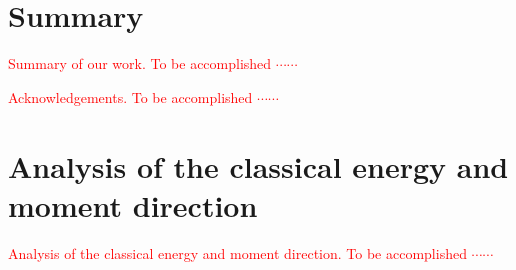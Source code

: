 \documentclass[aps,prb,reprint,amsfonts,amsmath,amssymb,showpacs,groupedaddress,superscriptaddress]{revtex4-1}
\begin{document}
\section{Summary}
\textcolor{red}{Summary of our work. To be accomplished $\cdots \cdots$}

\begin{acknowledgments}
    \textcolor{red}{Acknowledgements.  To be accomplished $\cdots \cdots$}
\end{acknowledgments}


\appendix

\section{Analysis of the classical energy and moment direction}

\textcolor{red}{Analysis of the classical energy and moment direction. To be accomplished $\cdots \cdots$}

\newpage


\end{document}
